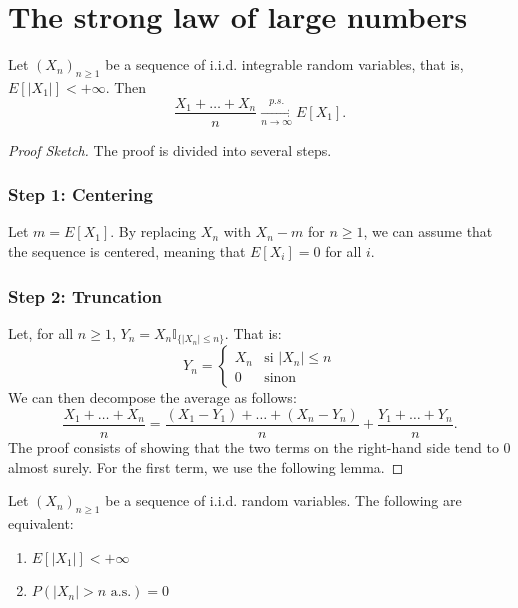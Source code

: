 \section{The strong law of large numbers}%
\begin{theorem}
Let $(X_n)_{n \ge 1}$ be a sequence of i.i.d. integrable random variables, that is, $E[|X_1|] < +\infty$. Then
\[
\frac{X_1 + \dots + X_n}{n} \xrightarrow[n\to\infty]{p.s.} E[X_1].
\]
\end{theorem}%
\begin{proof}[Proof Sketch]
The proof is divided into several steps.
\subsubsection*{Step 1: Centering}
Let $m = E[X_1]$. By replacing $X_n$ with $X_n - m$ for $n \ge 1$, we can assume that the sequence is centered, meaning that $E[X_i] = 0$ for all $i$.
\subsubsection*{Step 2: Truncation}
Let, for all $n \ge 1$, $Y_n = X_n \mathbb{I}_{\{|X_n| \le n\}}$. That is:
\[ Y_n = \begin{cases} X_n & \text{si } |X_n| \le n \\ 0 & \text{sinon} \end{cases} \]
We can then decompose the average as follows:
\[
\frac{X_1 + \dots + X_n}{n} = \frac{(X_1 - Y_1) + \dots + (X_n - Y_n)}{n} + \frac{Y_1 + \dots + Y_n}{n}.
\]
The proof consists of showing that the two terms on the right-hand side tend to 0 almost surely. For the first term, we use the following lemma.
\end{proof}%
\begin{lemma}
Let $(X_n)_{n \ge 1}$ be a sequence of i.i.d. random variables. The following are equivalent:
\begin{enumerate}
    \item[i)] $E[|X_1|] < +\infty$
    \item[ii)] $P(|X_n| > n \text{ a.s.}) = 0$
\end{enumerate}
\end{lemma}%
